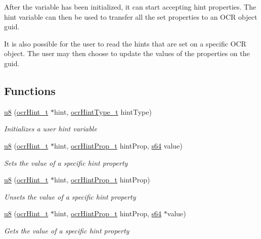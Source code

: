 After the variable has been initialized, it can start accepting hint properties.
The hint variable can then be used to transfer all the set properties to an OCR
object guid.

It is also possible for the user to read the hints that are set on a specific
OCR object. The user may then choose to update the values of the properties on
the guid.


\subsection*{Functions}
\begin{DoxyCompactItemize}
\item
  \hyperlink{type_u8}{u8} \hyperlink{func_ocrHintInit}
            {}(\hyperlink{type_ocrHint_t}{ocr\-Hint\-\_\-t} $\ast$hint,
      \hyperlink{type_ocrHintType_t}{ocrHintType\_t} hintType)
    \begin{DoxyCompactList}
      \small\item \emph{Initializes a user hint variable}
    \end{DoxyCompactList}
\item
  \hyperlink{type_u8}{u8} \hyperlink{func_ocrSetHintValue}
            {}(\hyperlink{type_ocrHint_t}{ocr\-Hint\-\_\-t} $\ast$hint,
      \hyperlink{type_ocrHintProp_t}{ocrHintProp\_t} hintProp, \hyperlink{type_s64}{s64} value)
    \begin{DoxyCompactList}
      \small\item \emph{Sets the value of a specific hint property}
    \end{DoxyCompactList}
\item
  \hyperlink{type_u8}{u8} \hyperlink{func_ocrUnsetHintValue}
            {}(\hyperlink{type_ocrHint_t}{ocr\-Hint\-\_\-t} $\ast$hint,
      \hyperlink{type_ocrHintProp_t}{ocrHintProp\_t} hintProp)
    \begin{DoxyCompactList}
      \small\item \emph{Unsets the value of a specific hint property}
    \end{DoxyCompactList}
\item
  \hyperlink{type_u8}{u8} \hyperlink{func_ocrGetHintValue}
            {}(\hyperlink{type_ocrHint_t}{ocr\-Hint\-\_\-t} $\ast$hint,
      \hyperlink{type_ocrHintProp_t}{ocrHintProp\_t} hintProp, \hyperlink{type_s64}{s64} $\ast$value)
    \begin{DoxyCompactList}
      \small\item \emph{Gets the value of a specific hint property}

\end{DoxyCompactList}
\end{DoxyCompactItemize}
